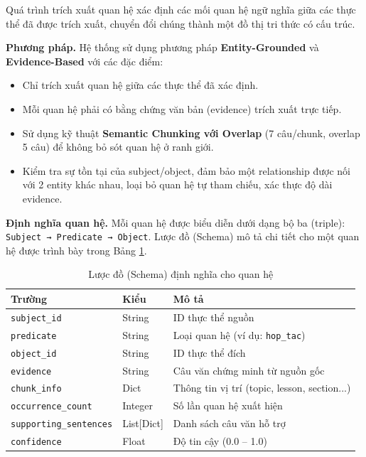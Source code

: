 Quá trình trích xuất quan hệ xác định các mối quan hệ ngữ nghĩa giữa các thực thể đã được trích xuất, chuyển đổi chúng thành một đồ thị tri thức có cấu trúc.

\noindent \textbf{Phương pháp.} Hệ thống sử dụng phương pháp \textbf{Entity-Grounded} và \textbf{Evidence-Based} với các đặc điểm:
\begin{itemize}
    \item Chỉ trích xuất quan hệ giữa các thực thể đã xác định.
    \item Mỗi quan hệ phải có bằng chứng văn bản (evidence) trích xuất trực tiếp.
    \item Sử dụng kỹ thuật \textbf{Semantic Chunking với Overlap} (7 câu/chunk, overlap 5 câu) để không bỏ sót quan hệ ở ranh giới.
    \item Kiểm tra sự tồn tại của subject/object, đảm bảo một relationship được nối với 2 entity khác nhau, loại bỏ quan hệ tự tham chiếu, xác thực độ dài evidence.
\end{itemize}

\noindent \textbf{Định nghĩa quan hệ.} Mỗi quan hệ được biểu diễn dưới dạng bộ ba (triple): \texttt{Subject → Predicate → Object}. Lược đồ (Schema) mô tả chi tiết cho một quan hệ được trình bày trong Bảng \ref{tab:relation_schema}.

\begin{table}[H]
\centering
\caption{Lược đồ (Schema) định nghĩa cho quan hệ}
\label{tab:relation_schema}
\begin{tabular}{|p{3.5cm}|p{2.5cm}|p{7.5cm}|}
\hline
\textbf{Trường} & \textbf{Kiểu} & \textbf{Mô tả} \\
\hline
\texttt{subject\_id} & String & ID thực thể nguồn \\
\hline
\texttt{predicate} & String & Loại quan hệ (ví dụ: \texttt{hop\_tac}) \\
\hline
\texttt{object\_id} & String & ID thực thể đích \\
\hline
\texttt{evidence} & String & Câu văn chứng minh từ nguồn gốc \\
\hline
\texttt{chunk\_info} & Dict & Thông tin vị trí (topic, lesson, section...) \\
\hline
\texttt{occurrence\_count} & Integer & Số lần quan hệ xuất hiện \\
\hline
\texttt{supporting\_sentences} & List[Dict] & Danh sách câu văn hỗ trợ \\
\hline
\texttt{confidence} & Float & Độ tin cậy (0.0 -- 1.0) \\
\hline
\end{tabular}
\end{table}

